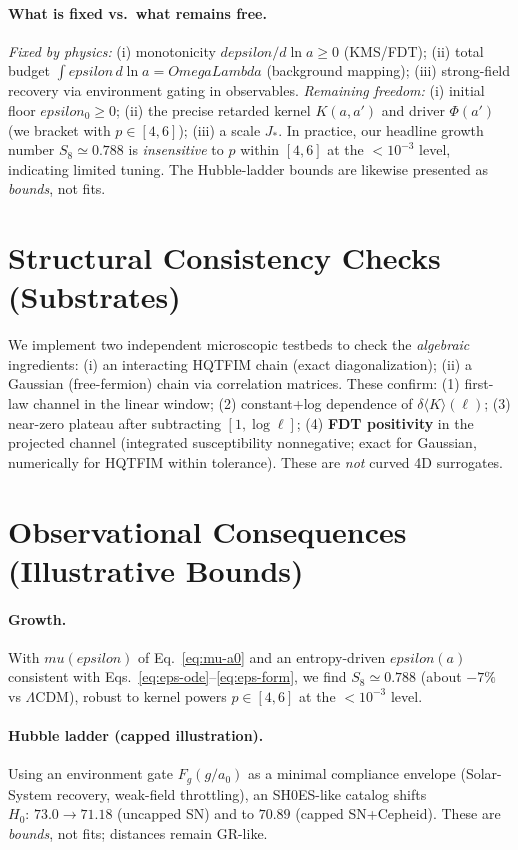 \documentclass[aps,prd,onecolumn,superscriptaddress,nofootinbib]{revtex4-2}
\def\OmL{OmegaLambda}%
\def\eps{epsilon}%
\def\mu{mu}%
\def\Omega_\Lambda{OmegaLambda}%
\providecommand{\OmL}{\Omega_\Lambda}
\providecommand{\eps}{\varepsilon}
\begin{document}
\paragraph{What is fixed vs.\ what remains free.}
\emph{Fixed by physics:} (i) monotonicity \(d\eps/d\ln a\ge 0\) (KMS/FDT); (ii) total budget \(\int \eps\, d\ln a=\OmL\) (background mapping); (iii) strong-field recovery via environment gating in observables. \emph{Remaining freedom:} (i) initial floor \(\eps_0\ge 0\); (ii) the precise retarded kernel \(K(a,a')\) and driver \(\Phi(a')\) (we bracket with \(p\in[4,6]\)); (iii) a scale \(J_*\). In practice, our headline growth number \(S_8\simeq 0.788\) is \emph{insensitive} to \(p\) within \([4,6]\) at the \(<10^{-3}\) level, indicating limited tuning. The Hubble-ladder bounds are likewise presented as \emph{bounds}, not fits.

\section{Structural Consistency Checks (Substrates)}
\label{sec:substrates}
We implement two independent microscopic testbeds to check the \emph{algebraic} ingredients: (i) an interacting HQTFIM chain (exact diagonalization); (ii) a Gaussian (free-fermion) chain via correlation matrices. These confirm: (1) first-law channel in the linear window; (2) constant+log dependence of \(\delta\!\langle K\rangle(\ell)\); (3) near-zero plateau after subtracting \([1,\log \ell]\); (4) \textbf{FDT positivity} in the projected channel (integrated susceptibility nonnegative; exact for Gaussian, numerically for HQTFIM within tolerance). These are \emph{not} curved 4D surrogates.

\section{Observational Consequences (Illustrative Bounds)}
\label{sec:obs}
\paragraph{Growth.} With \(\mu(\eps)\) of Eq.~\eqref{eq:mu-a0} and an entropy-driven \(\eps(a)\) consistent with Eqs.~\eqref{eq:eps-ode}–\eqref{eq:eps-form}, we find \(S_8\simeq 0.788\) (about \(-7\%\) vs \(\Lambda\)CDM), robust to kernel powers \(p\in[4,6]\) at the \(<10^{-3}\) level.\\
\paragraph{Hubble ladder (capped illustration).} Using an environment gate \(F_g(g/a_0)\) as a minimal compliance envelope (Solar-System recovery, weak-field throttling), an SH0ES-like catalog shifts \(H_0\!:\,73.0\to 71.18\) (uncapped SN) and to \(70.89\) (capped SN+Cepheid). These are \emph{bounds}, not fits; distances remain GR-like.
\end{document}

